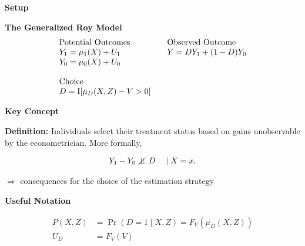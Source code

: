 \begin{frame}\begin{center}
\LARGE\textbf{Setup}
\end{center}\end{frame}
\begin{frame}\textbf{The Generalized Roy Model}\vspace{0.3cm}
\begin{align*}\begin{array}{l@{\qquad}l}
\text{Potential Outcomes} &\text{Observed Outcome}\\
Y_1 = \mu_1(X) + U_1      &  Y = D Y_1 + (1 - D)Y_0 \\
Y_0 = \mu_0(X) + U_0      &\\
    & \\
\text{Choice} & \\
D = \mathrm{I}[\mu_D(X, Z) - V > 0] & \\
\end{array}
\end{align*}
\end{frame}
\begin{frame}\textbf{Key Concept}\vspace{0.3cm}

\textbf{Definition:} Individuals select their treatment status based on
gains unobservable by the econometrician. More formally,

\begin{align*}
Y_1 - Y_0 \notindep D\quad \mid X = x.
\end{align*}

\(\Rightarrow\) consequences for the choice of the estimation strategy

\end{frame}
\begin{frame}\textbf{Useful Notation}\vspace{0.3cm}

\begin{align*}
P(X, Z) & = \Pr(D = 1 \mid X, Z)  = F_V(\mu_D(X, Z)) \\
U_D & = F_V(V)
\end{align*}

\end{frame}
